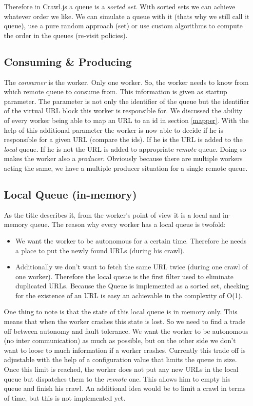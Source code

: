 Therefore in Crawl.js a queue is a \emph{sorted set}. With sorted sets we can achieve whatever order we like. We can simulate a queue with it (thats why we still call it queue), use a pure random approach (set) or use custom algorithms to compute the order in the queues (re-visit policies).

\subsection{Consuming \& Producing}
The \emph{consumer} is the worker. Only one worker. So, the worker needs to know from which remote queue to consume from. This information is given as startup parameter. The parameter is not only the identifier of the queue but the identifier of the virtual URL block this worker is responsible for. We discussed the ability of every worker being able to map an URL to an id in section \ref{mapper}. With the help of this additional parameter the worker is now able to decide if he is responsible for a given URL (compare the ids). If he is the URL is added to the \emph{local} queue. If he is not the URL is added to appropriate \emph{remote} queue. Doing so makes the worker also a \emph{producer}. Obviously because there are multiple workers acting the same, we have a multiple producer situation for a single remote queue. 

\subsection{Local Queue (in-memory)}
\label{queues_local}
As the title describes it, from the worker's point of view it is a local and in-memory queue. The reason why every worker has a local queue is twofold:
\begin{itemize}
  \item We want the worker to be autonomous for a certain time. Therefore he needs a place to put the newly found URLs (during his crawl).
  \item Additionally we don't want to fetch the same URL twice (during one crawl of one worker). Therefore the local queue is the first filter used to eliminate duplicated URLs. Because the Queue is implemented as a sorted set, checking for the existence of an URL is easy an achievable in the complexity of O(1).
\end{itemize}

One thing to note is that the state of this local queue is in memory only. This means that when the worker crashes this state is lost. So we need to find a trade off between autonomy and fault tolerance. We want the worker to be autonomous (no inter communication) as much as possible, but on the other side we don't want to loose to much information if a worker crashes. Currently this trade off is adjustable with the help of a configuration value that limits the queue in size. Once this limit is reached, the worker does not put any new URLs in the local queue but dispatches them to the \emph{remote} one. This allows him to empty his queue and finish his crawl. An additional idea would be to limit a crawl in terms of time, but this is not implemented yet.

